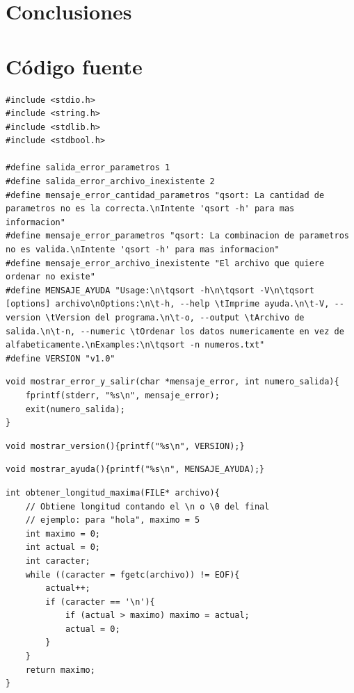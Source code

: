 \documentclass[a4paper, 12pt]{article}
\begin{document}
	\section{Conclusiones}
	
	\newpage
	\section{Código fuente}
	
	\begin{lstlisting}
#include <stdio.h>
#include <string.h>
#include <stdlib.h>
#include <stdbool.h>

#define salida_error_parametros 1
#define salida_error_archivo_inexistente 2
#define mensaje_error_cantidad_parametros "qsort: La cantidad de parametros no es la correcta.\nIntente 'qsort -h' para mas informacion"
#define mensaje_error_parametros "qsort: La combinacion de parametros no es valida.\nIntente 'qsort -h' para mas informacion"
#define mensaje_error_archivo_inexistente "El archivo que quiere ordenar no existe"
#define MENSAJE_AYUDA "Usage:\n\tqsort -h\n\tqsort -V\n\tqsort [options] archivo\nOptions:\n\t-h, --help \tImprime ayuda.\n\t-V, --version \tVersion del programa.\n\t-o, --output \tArchivo de salida.\n\t-n, --numeric \tOrdenar los datos numericamente en vez de alfabeticamente.\nExamples:\n\tqsort -n numeros.txt"
#define VERSION "v1.0"
	\end{lstlisting}
	
	\begin{lstlisting}
void mostrar_error_y_salir(char *mensaje_error, int numero_salida){
	fprintf(stderr, "%s\n", mensaje_error);
    exit(numero_salida);
}
	\end{lstlisting}
	
	\begin{lstlisting}
void mostrar_version(){printf("%s\n", VERSION);}
	\end{lstlisting}
	
	\begin{lstlisting}
void mostrar_ayuda(){printf("%s\n", MENSAJE_AYUDA);}
	\end{lstlisting}
	
	\begin{lstlisting}
int obtener_longitud_maxima(FILE* archivo){
    // Obtiene longitud contando el \n o \0 del final
    // ejemplo: para "hola", maximo = 5
    int maximo = 0;
    int actual = 0;
    int caracter;
    while ((caracter = fgetc(archivo)) != EOF){
        actual++;
        if (caracter == '\n'){
            if (actual > maximo) maximo = actual;
            actual = 0;
        }
    }
    return maximo;
}
	\end{lstlisting}
	
\end{document}
